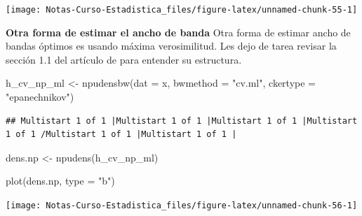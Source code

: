 \documentclass[
  12pt,
]{book}
\newenvironment{Shaded}{\begin{snugshade}}{\end{snugshade}}
\newcommand{\AttributeTok}[1]{\textcolor[rgb]{0.77,0.63,0.00}{#1}}
\newcommand{\FunctionTok}[1]{\textcolor[rgb]{0.00,0.00,0.00}{#1}}
\newcommand{\NormalTok}[1]{#1}
\newcommand{\OtherTok}[1]{\textcolor[rgb]{0.56,0.35,0.01}{#1}}
\newcommand{\StringTok}[1]{\textcolor[rgb]{0.31,0.60,0.02}{#1}}
\theoremstyle{definition}
\theoremstyle{definition}
\theoremstyle{definition}
\theoremstyle{remark}
\begin{document}
\begin{center}\texttt{[image: Notas-Curso-Estadistica\_files/figure-latex/unnamed-chunk-55-1]} \end{center}

\textbf{Otra forma de estimar el ancho de banda} Otra forma de estimar ancho de bandas óptimos es usando máxima verosimilitud. Les dejo de tarea revisar la sección 1.1 del artículo de \autocite{Hall1987} para entender su estructura.

\begin{Shaded}
\begin{Highlighting}[]
\NormalTok{h\_cv\_np\_ml }\OtherTok{\textless{}{-}} \FunctionTok{npudensbw}\NormalTok{(}\AttributeTok{dat =}\NormalTok{ x, }\AttributeTok{bwmethod =} \StringTok{"cv.ml"}\NormalTok{, }
    \AttributeTok{ckertype =} \StringTok{"epanechnikov"}\NormalTok{)}
\end{Highlighting}
\end{Shaded}

\begin{verbatim}
## Multistart 1 of 1 |Multistart 1 of 1 |Multistart 1 of 1 |Multistart 1 of 1 /Multistart 1 of 1 |Multistart 1 of 1 |                   
\end{verbatim}

\begin{Shaded}
\begin{Highlighting}[]
\NormalTok{dens.np }\OtherTok{\textless{}{-}} \FunctionTok{npudens}\NormalTok{(h\_cv\_np\_ml)}

\FunctionTok{plot}\NormalTok{(dens.np, }\AttributeTok{type =} \StringTok{"b"}\NormalTok{)}
\end{Highlighting}
\end{Shaded}

\begin{center}\texttt{[image: Notas-Curso-Estadistica\_files/figure-latex/unnamed-chunk-56-1]} \end{center}
\end{document}
